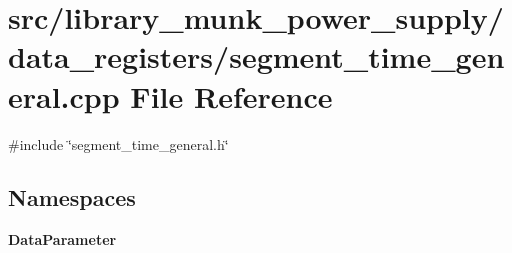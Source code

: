 \section{src/library\+\_\+munk\+\_\+power\+\_\+supply/data\+\_\+registers/segment\+\_\+time\+\_\+general.cpp File Reference}
\label{segment__time__general_8cpp}
{\ttfamily \#include \char`\"{}segment\+\_\+time\+\_\+general.\+h\char`\"{}}\newline
\subsection*{Namespaces}
\begin{DoxyCompactItemize}
\item 
 \textbf{ Data\+Parameter}
\end{DoxyCompactItemize}
